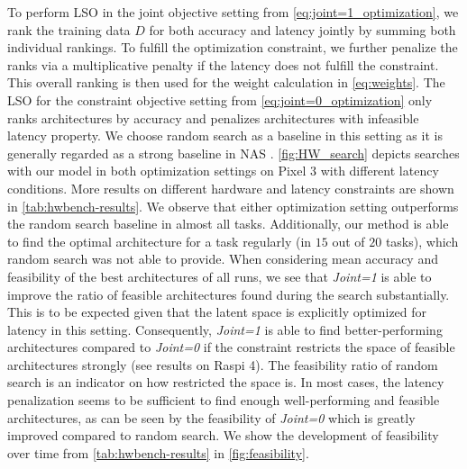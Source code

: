 \documentclass[runningheads]{llncs}
\begin{document}
To perform LSO in the joint objective setting from \autoref{eq:joint=1_optimization}, we rank the training data $D$ for both accuracy and latency jointly by summing both individual rankings.
To fulfill the optimization constraint, we further penalize the ranks via a multiplicative penalty if the latency does not fulfill the constraint.
This overall ranking is then used for the weight calculation in \autoref{eq:weights}.
The LSO for the constraint objective setting from \autoref{eq:joint=0_optimization} only ranks architectures by accuracy and penalizes architectures with infeasible latency property.
We choose random search as a baseline in this setting as it is generally regarded as a strong baseline in NAS \cite{2019RS}.
\autoref{fig:HW_search} depicts searches with our model in both optimization settings on Pixel 3 with different latency conditions.
More results on different hardware and latency constraints are shown in \autoref{tab:hwbench-results}.
We observe that either optimization setting outperforms the random search baseline in almost all tasks.
Additionally, our method is able to find the optimal architecture for a task regularly (in $15$ out of $20$ tasks), which random search was not able to provide.
When considering mean accuracy and feasibility of the best architectures of all runs, we see that \emph{Joint=1} is able to improve the ratio of feasible architectures found during the search substantially.
This is to be expected given that the latent space is explicitly optimized for latency in this setting.
Consequently, \emph{Joint=1} is able to find better-performing architectures compared to \emph{Joint=0} if the constraint restricts the space of feasible architectures strongly (see results on Raspi 4).
The feasibility ratio of random search is an indicator on how restricted the space is.
In most cases, the latency penalization seems to be sufficient to find enough well-performing and feasible architectures, as can be seen by the feasibility of \emph{Joint=0} which is greatly improved compared to random search.
We show the development of feasibility over time from \autoref{tab:hwbench-results} in \autoref{fig:feasibility}.
\end{document}
